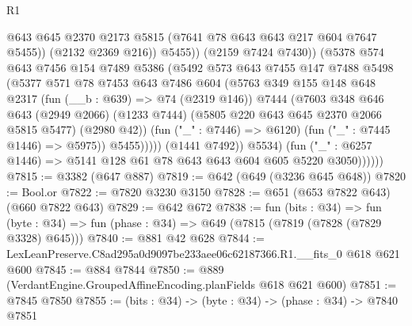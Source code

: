 \begin{lexlean}{R1}
\begin{coremodule}
                                @643
                                @645
                                @2370
                                @2173
                                @5815
                                (@7641 @78 @643 @643 @217 @604 @7647 @5455))
                              (@2132 @2369 @216))
                            @5455))
                        (@2159 @7424 @7430))
                      (@5378
                        @574
                        @643
                        @7456
                        @154
                        @7489
                        @5386
                        (@5492
                          @573
                          @643
                          @7455
                          @147
                          @7488
                          @5498
                          (@5377
                            @571
                            @78
                            @7453
                            @643
                            @7486
                            @604
                            (@5763
                              @349
                              @155
                              @148
                              @648
                              @2317
                              (fun (__b : @639) => @74 (@2319 @146))
                              @7444
                              (@7603
                                @348
                                @646
                                @643
                                (@2949 @2066)
                                (@1233 @7444)
                                (@5805 @220 @643 @645 @2370 @2066 @5815 @5477)
                                (@2980 @42))
                              (fun ("_" : @7446) => @6120)
                              (fun ("_" : @7445 @1446) => @5975))
                            @5455)))))
                  (@1441 @7492))
                @5534)
              (fun ("_" : @6257 @1446) => @5141 @128 @61 @78 @643 @643 @604 @605 @5220 @3050))))))
@7815 := @3382 (@647 @887)
@7819 := @642 (@649 (@3236 @645 @648))
@7820 := Bool.or
@7822 := @7820 @3230 @3150
@7828 := @651 (@653 @7822 @643) (@660 @7822 @643)
@7829 := @642 @672
@7838 := fun (bits : @34) =>
  fun (byte : @34) => fun (phase : @34) => @649 (@7815 (@7819 (@7828 (@7829 @3328) @645)))
@7840 := @881 @42 @628
@7844 := LexLeanPreserve.C8ad295a0d9097be233aee06c62187366.R1.__fits_0 @618 @621 @600
@7845 := @884 @7844
@7850 := @889 (VerdantEngine.GroupedAffineEncoding.planFields @618 @621 @600)
@7851 := @7845 @7850
@7855 := (bits : @34) -> (byte : @34) -> (phase : @34) -> @7840 @7851

\end{coremodule}
\end{lexlean}

